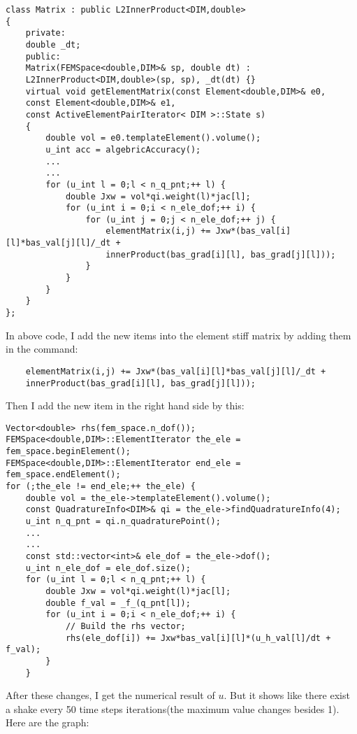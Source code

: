 \documentclass[12pt,openany]{article}
\begin{document}
\begin{lstlisting}
class Matrix : public L2InnerProduct<DIM,double>
{
	private:
	double _dt;
	public:
	Matrix(FEMSpace<double,DIM>& sp, double dt) :
	L2InnerProduct<DIM,double>(sp, sp), _dt(dt) {}
	virtual void getElementMatrix(const Element<double,DIM>& e0,
	const Element<double,DIM>& e1,
	const ActiveElementPairIterator< DIM >::State s)
	{
		double vol = e0.templateElement().volume();
		u_int acc = algebricAccuracy();
		...
		...
		for (u_int l = 0;l < n_q_pnt;++ l) {
			double Jxw = vol*qi.weight(l)*jac[l];
			for (u_int i = 0;i < n_ele_dof;++ i) {
				for (u_int j = 0;j < n_ele_dof;++ j) {
					elementMatrix(i,j) += Jxw*(bas_val[i][l]*bas_val[j][l]/_dt +
					innerProduct(bas_grad[i][l], bas_grad[j][l]));
				}
			}
		}
	}
};	
\end{lstlisting}
In above code, I add the new items into the element stiff matrix by adding them in the command:
\begin{lstlisting}
	elementMatrix(i,j) += Jxw*(bas_val[i][l]*bas_val[j][l]/_dt +
	innerProduct(bas_grad[i][l], bas_grad[j][l]));
\end{lstlisting}

Then I add the new item in the right hand side by this:
\begin{lstlisting}
Vector<double> rhs(fem_space.n_dof());
FEMSpace<double,DIM>::ElementIterator the_ele = fem_space.beginElement();
FEMSpace<double,DIM>::ElementIterator end_ele = fem_space.endElement();
for (;the_ele != end_ele;++ the_ele) {
	double vol = the_ele->templateElement().volume();
	const QuadratureInfo<DIM>& qi = the_ele->findQuadratureInfo(4);
	u_int n_q_pnt = qi.n_quadraturePoint();
	...
	...
	const std::vector<int>& ele_dof = the_ele->dof();
	u_int n_ele_dof = ele_dof.size();
	for (u_int l = 0;l < n_q_pnt;++ l) {
		double Jxw = vol*qi.weight(l)*jac[l];
		double f_val = _f_(q_pnt[l]);
		for (u_int i = 0;i < n_ele_dof;++ i) {
			// Build the rhs vector;
			rhs(ele_dof[i]) += Jxw*bas_val[i][l]*(u_h_val[l]/dt + f_val);
		}
	}
\end{lstlisting}
After these changes, I get the numerical result of $u$. But it shows like there exist a shake every 50 time steps iterations(the maximum value changes besides 1).\\	

Here are the graph:


\newpage
{}


\end{document}
